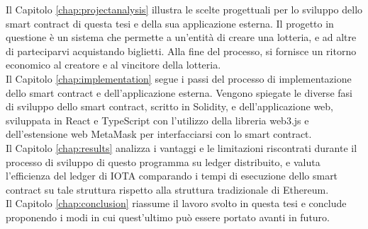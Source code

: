 \documentclass[12pt,a4paper,openright,twoside]{report}
\begin{document}
Il Capitolo \ref{chap:projectanalysis} illustra le scelte progettuali per lo sviluppo dello smart contract di questa tesi e della sua applicazione esterna. Il progetto in questione è un sistema che permette a un'entità di creare una lotteria, e ad altre di parteciparvi acquistando biglietti. Alla fine del processo, si fornisce un ritorno economico al creatore e al vincitore della lotteria.\\
Il Capitolo \ref{chap:implementation} segue i passi del processo di implementazione dello smart contract e dell'applicazione esterna. Vengono spiegate le diverse fasi di sviluppo dello smart contract, scritto in Solidity, e dell'applicazione web, sviluppata in React e TypeScript con l'utilizzo della libreria web3.js e dell'estensione web MetaMask per interfacciarsi con lo smart contract.\\
Il Capitolo \ref{chap:results} analizza i vantaggi e le limitazioni riscontrati durante il processo di sviluppo di questo programma su ledger distribuito, e valuta l'efficienza del ledger di IOTA comparando i tempi di esecuzione dello smart contract su tale struttura rispetto alla struttura tradizionale di Ethereum.\\
Il Capitolo \ref{chap:conclusion} riassume il lavoro svolto in questa tesi e conclude proponendo i modi in cui quest'ultimo può essere portato avanti in futuro.

\clearpage{\pagestyle{empty}\cleardoublepage}



\end{document}
